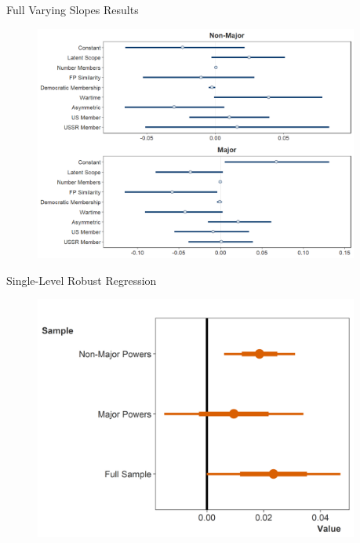 \documentclass{beamer}
\begin{document}

\begin{frame}{Full Varying Slopes Results}

\begin{figure}[htbp]
	\centering
		\includegraphics[width=0.95\textwidth]{vs-res-full.png}
\end{figure}

\end{frame}




\begin{frame}{Single-Level Robust Regression}

\begin{figure}[htbp]
	\centering
		\includegraphics[width=0.95\textwidth]{robust-reg-coef.png}
	\label{fig:robust-reg-coef}
\end{figure}



\end{frame}



\end{document}
